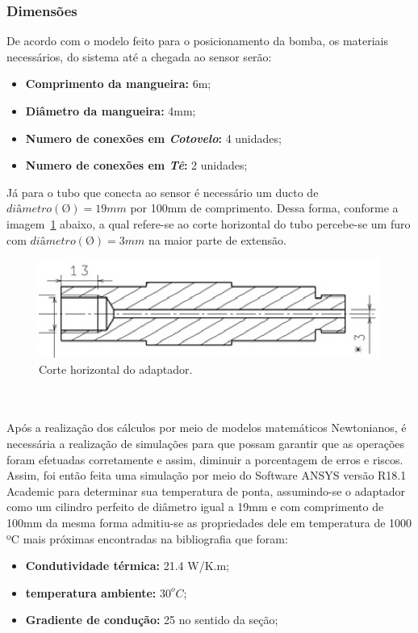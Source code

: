 \subsubsection{Dimensões}
De acordo com o modelo feito para o posicionamento da bomba, os materiais necessários, do sistema até a chegada ao sensor serão: 
\begin{itemize}
	\item \textbf{Comprimento da mangueira:} 6m;
	\item \textbf{Diâmetro da mangueira:} 4mm;
	\item \textbf{Numero de conexões em \emph{Cotovelo}:} 4 unidades;
	\item \textbf{Numero de conexões em \emph{Tê}:} 2 unidades;
\end{itemize}
Já para o tubo que conecta ao sensor é necessário um ducto de $diâmetro(Ø) =19mm$ por 100mm de comprimento. Dessa forma, conforme a imagem~\ref{fig7tc} abaixo, a qual refere-se ao corte horizontal do tubo percebe-se um furo com $diâmetro(Ø) =3mm$ na maior parte de extensão.
\begin{figure}[!htb]                  
	\centering                          
	\includegraphics[scale=1]{figuras/Figura7tc.eps}
	\caption{Corte horizontal  do adaptador.} \label{fig7tc}              
\end{figure}
\\\\Após a realização dos cálculos por meio de modelos matemáticos Newtonianos, é necessária a realização de simulações para que possam garantir que as operações foram efetuadas corretamente e assim, diminuir a porcentagem de erros e riscos.
Assim, foi então feita uma simulação por meio do Software ANSYS versão R18.1 Academic para determinar sua temperatura de ponta, assumindo-se o adaptador como um cilindro perfeito de diâmetro igual a 19mm e com comprimento de 100mm da mesma forma admitiu-se as propriedades dele em temperatura de 1000 ºC mais próximas encontradas na bibliografia que foram:
\begin{itemize}
	\item \textbf{Condutividade térmica:} 21.4 W/K.m;
	\item \textbf{temperatura ambiente:} $30^oC$;
	\item \textbf{Gradiente de condução:} 25 no sentido da seção;
\end{itemize}
